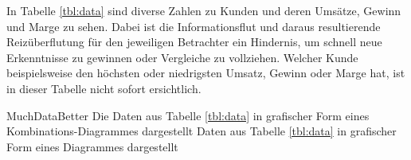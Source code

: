 
In Tabelle \ref{tbl:data} sind diverse Zahlen zu Kunden und deren Umsätze, Gewinn und Marge zu sehen.
Dabei ist die Informationsflut und daraus resultierende Reizüberflutung für den jeweiligen Betrachter ein Hindernis, um schnell neue Erkenntnisse zu gewinnen oder Vergleiche zu vollziehen.
Welcher Kunde beispielsweise den höchsten oder niedrigsten Umsatz, Gewinn oder Marge hat, ist in dieser Tabelle nicht sofort ersichtlich.

\bildbreit
{MuchDataBetter}
{Die Daten aus Tabelle \ref{tbl:data} in grafischer Form eines Kombinations-Diagrammes dargestellt}
{Daten aus Tabelle \ref{tbl:data} in grafischer Form eines Diagrammes dargestellt}

